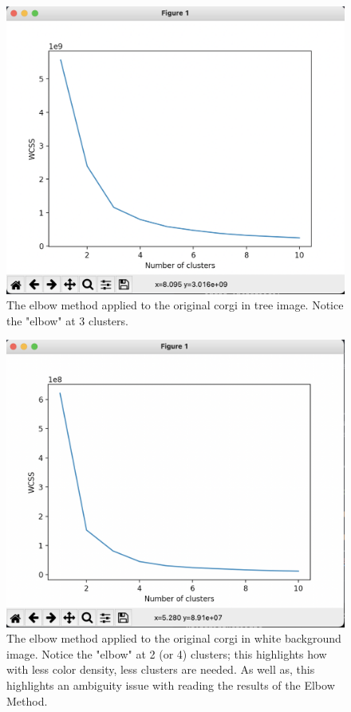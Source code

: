 \documentclass[10pt,twocolumn]{article}
\begin{document}
\begin{figure}[h]
  \centering
  \includegraphics[scale=0.3] {corgi_tree_elbow}
  \vspace{20px}
  \caption{The elbow method applied to the original corgi in tree image. Notice the "elbow" at 3 clusters.}
  \label{ctree:elbow}
\end{figure}
\begin{figure}[h]
  \centering
  \includegraphics[scale=0.3] {corgi_white_elbow}
  \vspace{20px}
  \caption{The elbow method applied to the original corgi in white background image. Notice the "elbow" at 2 (or 4) clusters; this highlights how with less color density, less clusters are needed. As well as, this highlights an ambiguity issue with reading the results of the Elbow Method.}
  \label{cwhite:elbow}
\end{figure}
\end{document}
